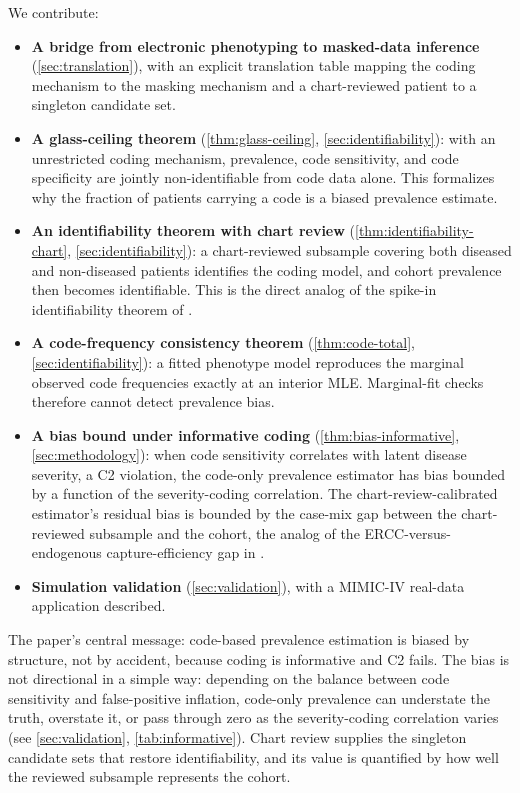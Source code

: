 We contribute:

\begin{itemize}
\item \textbf{A bridge from electronic phenotyping to masked-data
  inference} (\cref{sec:translation}), with an explicit translation
  table mapping the coding mechanism to the masking mechanism and a
  chart-reviewed patient to a singleton candidate set.

\item \textbf{A glass-ceiling theorem} (\cref{thm:glass-ceiling},
  \cref{sec:identifiability}): with an unrestricted coding mechanism,
  prevalence, code sensitivity, and code specificity are jointly
  non-identifiable from code data alone. This formalizes why the
  fraction of patients carrying a code is a biased prevalence
  estimate.

\item \textbf{An identifiability theorem with chart review}
  (\cref{thm:identifiability-chart}, \cref{sec:identifiability}): a
  chart-reviewed subsample covering both diseased and non-diseased
  patients identifies the coding model, and cohort prevalence then
  becomes identifiable. This is the direct analog of the spike-in
  identifiability theorem of \citet{towell2026scrnacoarsening}.

\item \textbf{A code-frequency consistency theorem}
  (\cref{thm:code-total}, \cref{sec:identifiability}): a fitted
  phenotype model reproduces the marginal observed code frequencies
  exactly at an interior MLE. Marginal-fit checks therefore cannot
  detect prevalence bias.

\item \textbf{A bias bound under informative coding}
  (\cref{thm:bias-informative}, \cref{sec:methodology}): when code
  sensitivity correlates with latent disease severity, a C2 violation,
  the code-only prevalence estimator has bias bounded by a function of
  the severity-coding correlation. The chart-review-calibrated
  estimator's residual bias is bounded by the case-mix gap between the
  chart-reviewed subsample and the cohort, the analog of the
  ERCC-versus-endogenous capture-efficiency gap in
  \citet{towell2026scrnacoarsening}.

\item \textbf{Simulation validation} (\cref{sec:validation}), with a
  MIMIC-IV \citep{johnson2023mimiciv} real-data application described.
\end{itemize}

The paper's central message: code-based prevalence estimation is
biased by structure, not by accident, because coding is informative
and C2 fails. The bias is not directional in a simple way: depending
on the balance between code sensitivity and false-positive inflation,
code-only prevalence can understate the truth, overstate it, or pass
through zero as the severity-coding correlation varies (see
\cref{sec:validation}, \cref{tab:informative}). Chart review supplies
the singleton candidate sets that restore identifiability, and its
value is quantified by how well the reviewed subsample represents the
cohort.
